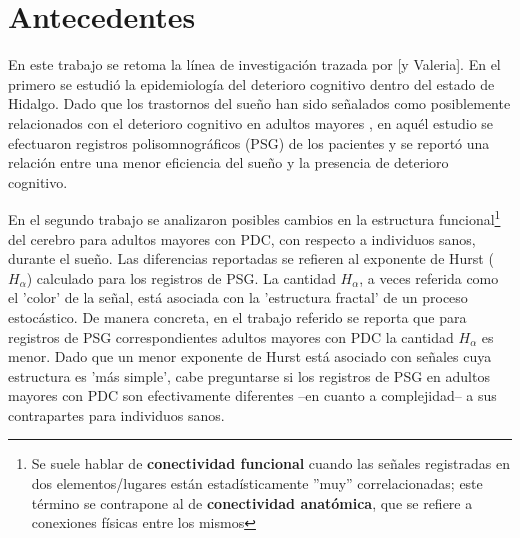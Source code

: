 \documentclass[12pt,a4paper]{mitthesis}
\begin{document}
\setcounter{page}{1}

\chapter{Antecedentes}

En este trabajo se retoma la l\'inea de investigaci\'on trazada por \cite{VazquezTagle16} [y
Valeria]. 
En el primero se estudi\'o la epidemiolog\'ia del deterioro cognitivo dentro del estado de
Hidalgo. Dado que los trastornos del sue\~no han sido se\~nalados como posiblemente relacionados
con el deterioro cognitivo en adultos mayores \cite{Amer13,Miyata13,Potvin12}, en aqu\'el estudio
se efectuaron registros polisomnogr\'aficos (PSG) de los pacientes y se report\'o una relaci\'on
entre una menor eficiencia del sue\~no y la presencia de deterioro cognitivo.

En el segundo trabajo se analizaron posibles cambios en la estructura funcional\footnote{Se suele 
hablar de \textbf{conectividad funcional} cuando las se\~nales registradas en dos elementos/lugares 
est\'an estad\'isticamente ''muy'' correlacionadas; este t\'ermino se contrapone al de
\textbf{conectividad anat\'omica}, que se refiere a conexiones f\'isicas entre los mismos} del 
cerebro para adultos mayores con PDC, con respecto a individuos sanos, durante el sue\~no.
Las diferencias reportadas se refieren al exponente de Hurst ($H_\alpha$) calculado para los 
registros de PSG.
La cantidad $H_\alpha$, a veces referida como el 'color' de la se\~nal, est\'a asociada con la
'estructura fractal' de un proceso estoc\'astico. De manera concreta, en el trabajo referido se 
reporta que para registros de PSG correspondientes adultos mayores con PDC la cantidad $H_\alpha$ 
es menor. Dado que un menor exponente de Hurst est\'a asociado con se\~nales cuya estructura es 
'm\'as simple', cabe preguntarse si los registros de PSG en adultos mayores con PDC son 
efectivamente diferentes --en cuanto a complejidad-- a sus contrapartes para individuos sanos. 
\end{document}
